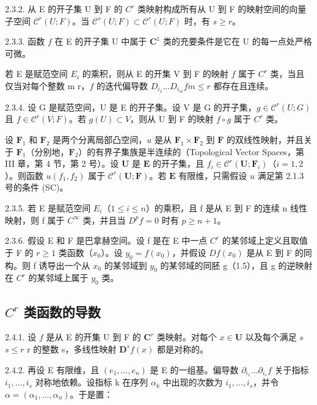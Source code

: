 2.3.2. 从 E 的开子集 U 到 F 的 \(C^{r}\) 类映射构成所有从 U 到 F 的映射空间的向量子空间 \(\mathcal{C}^{r}(U;F)\)。当 \(\mathcal{C}^{s}(U;F)\subset\mathcal{C}^{r}(U;F)\) 时，有 \(s\geqslant r\)。

2.3.3. 函数 \(f\) 在 E 的开子集 U 中属于 \(\mathbf{C}^{1}\) 类的充要条件是它在 U 的每一点处严格可微。

若 E 是赋范空间 \(E_{i}\) 的乘积，则从 E 的开集 V 到 F 的映射 \(f\) 属于 \(C^{r}\) 类，当且仅当对每个整数 m  r，\(f\) 的迭代偏导数 \(D_{i_{1}}\ldots D_{i_{m}}f\)\(m \leqslant r\) 都存在且连续。

2.3.4. 设 G 是赋范空间，U 是 E 的开子集。设 V 是 G 的开子集，\(g \in \mathcal{C}^{r}(U; G)\) 且 \(f \in \mathcal{C}^{r}(V; F)\)。若 \(g(U) \subset V\)，则从 U 到 F 的映射 \(f \circ g\) 属于 \(C^{r}\) 类。

设 \(\mathbf{F}_1\) 和 \(\mathbf{F}_2\) 是两个分离局部凸空间，\(u\) 是从 \(\mathbf{F}_1 \times \mathbf{F}_2\) 到 \(\mathbf{F}\) 的双线性映射，并且关于 \(\mathbf{F}_1\)（分别地，\(\mathbf{F}_2\)）的有界子集族是半连续的（Topological Vector Spaces，第 III 章，第 4 节，第 2 号）。设 \(\mathbf{U}\) 是 \(\mathbf{E}\) 的开子集，且 \(f_i \in \mathcal{C}^r(\mathbf{U};\mathbf{F}_i)\)（\(i = 1,2\)）。则函数 \(u(f_1,f_2)\) 属于 \(\mathcal{C}^r(\mathbf{U};\mathbf{F})\)。若 \(\mathbf{E}\) 有限维，只需假设 \(u\) 满足第 2.1.3 号的条件 (SC)。

2.3.5. 若 E 是赋范空间 \(E_{i}\)（\(1 \leqslant i \leqslant n\)）的乘积，且 f 是从 E 到 F 的连续 n 线性映射，则 f 属于 \(C^{\infty}\) 类，并且当 \(D^{p}f = 0\) 时有 \(p \geqslant n + 1\)。

2.3.6. 假设 E 和 F 是巴拿赫空间。设 f 是在 E 中一点 \(C^{r}\) 的某邻域上定义且取值于 F 的 \(r \geqslant 1\) 类函数（\(x_{0}\)）。设 \(y_{0} = f(x_{0})\)，并假设 \(Df(x_{0})\) 是从 E 到 F 的同构。则 f 诱导出一个从 \(x_{0}\) 的某邻域到 \(y_{0}\) 的某邻域的同胚 g（1.5），且 g 的逆映射在 \(C^{r}\) 的某邻域上属于 \(y_{0}\) 类。

\subsection{\texorpdfstring{\(C^{r}\) 类函数的导数}{C\^{}\{r\} 类函数的导数}}

2.4.1. 设 \(f\) 是从 E 的开集 U 到 F 的 \(\mathbf{C}^{r}\) 类映射。对每个 \(x \in \mathbf{U}\) 以及每个满足 \(s\)\(s \leqslant r\)  r 的整数 s，多线性映射 \(\mathbf{D}^{s}f(x)\) 都是对称的。

2.4.2. 再设 E 有限维，且 \((e_{1},\ldots,e_{n})\) 是 E 的一组基。偏导数 \(\partial_{i_{1}}\ldots\partial_{i_{s}}f\) 关于指标 \(i_{1},\ldots,i_{s}\) 对称地依赖。设指标 k 在序列 \(\alpha_{k}\) 中出现的次数为 \(i_{1},\ldots,i_{s}\)，并令 \(\alpha=(\alpha_{1},\ldots,\alpha_{n})\)。于是置：

